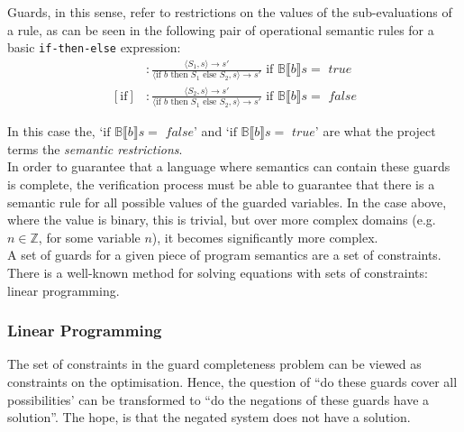 Guards, in this sense, refer to restrictions on the values of the sub-evaluations of a rule, as can be seen in the following pair of operational semantic rules for a basic \texttt{if-then-else} expression:
\begin{align}
    [\text{if}] &: \frac{\langle S_1, s \rangle \to s'}{\langle \text{if } b \text{ then } S_1 \text{ else } S_2, s\rangle \to s'} \text{ if } \mathbb{B}\llbracket b \rrbracket s = \textit{ true} \\
    [\text{if}] &: \frac{\langle S_2, s \rangle \to s'}{\langle \text{if } b \text{ then } S_1 \text{ else } S_2, s\rangle \to s'} \text{ if } \mathbb{B}\llbracket b \rrbracket s = \textit{ false}
\end{align}

In this case the, `$\text{if } \mathbb{B}\llbracket b \rrbracket s = \textit{ false}$' and `$\text{if }\mathbb{B}\llbracket b \rrbracket s = \textit{ true}$' are what the project terms the \textit{semantic restrictions}.\\

In order to guarantee that a language where semantics can contain these guards is complete, the verification process must be able to guarantee that there is a semantic rule for all possible values of the guarded variables.
In the case above, where the value is binary, this is trivial, but over more complex domains (e.g. $n \in \mathbb{Z}$, for some variable $n$), it becomes significantly more complex.\\

A set of guards for a given piece of program semantics are a set of constraints.
There is a well-known method for solving equations with sets of constraints: linear programming.

\subsubsection{Linear Programming} %
\label{ssub:linear_programming}

The set of constraints in the guard completeness problem can be viewed as constraints on the optimisation.
Hence, the question of ``do these guards cover all possibilities' can be transformed to ``do the negations of these guards have a solution''. 
The hope, is that the negated system does not have a solution.\\

